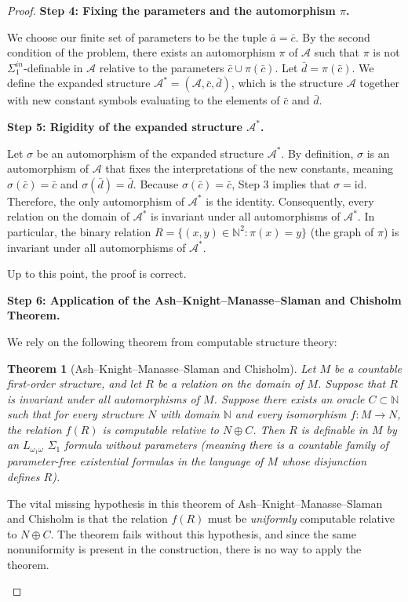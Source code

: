 \documentclass[12pt]{article}
\newtheorem*{theorem*}{Theorem}
\newcommand{\review}[1]{\begin{reviewbox}#1\end{reviewbox}}
\begin{document}
\begin{proof}
\textbf{Step 4: Fixing the parameters and the automorphism $\pi$.}

We choose our finite set of parameters to be the tuple $\bar{a} = \bar{c}$. By the second condition of the problem, there exists an automorphism $\pi$ of $\mathcal{A}$ such that $\pi$ is not $\Sigma^{in}_1$-definable in $\mathcal{A}$ relative to the parameters $\bar{c} \cup \pi(\bar{c})$. 
Let $\bar{d} = \pi(\bar{c})$. 
We define the expanded structure $\mathcal{A}^* = (\mathcal{A}, \bar{c}, \bar{d})$, which is the structure $\mathcal{A}$ together with new constant symbols evaluating to the elements of $\bar{c}$ and $\bar{d}$. 

\textbf{Step 5: Rigidity of the expanded structure $\mathcal{A}^*$.}

Let $\sigma$ be an automorphism of the expanded structure $\mathcal{A}^*$. By definition, $\sigma$ is an automorphism of $\mathcal{A}$ that fixes the interpretations of the new constants, meaning $\sigma(\bar{c}) = \bar{c}$ and $\sigma(\bar{d}) = \bar{d}$. 
Because $\sigma(\bar{c}) = \bar{c}$, Step 3 implies that $\sigma = \mathrm{id}$. 
Therefore, the only automorphism of $\mathcal{A}^*$ is the identity. Consequently, every relation on the domain of $\mathcal{A}^*$ is invariant under all automorphisms of $\mathcal{A}^*$. 
In particular, the binary relation $R = \{(x, y) \in \mathbb{N}^2 : \pi(x) = y\}$ (the graph of $\pi$) is invariant under all automorphisms of $\mathcal{A}^*$.

\review{Up to this point, the proof is correct.}

\textbf{Step 6: Application of the Ash--Knight--Manasse--Slaman and Chisholm Theorem.}

We rely on the following theorem from computable structure theory:
\begin{theorem*}[Ash--Knight--Manasse--Slaman and Chisholm]
Let $M$ be a countable first-order structure, and let $R$ be a relation on the domain of $M$. Suppose that $R$ is invariant under all automorphisms of $M$. Suppose there exists an oracle $C \subset \mathbb{N}$ such that for every structure $N$ with domain $\mathbb{N}$ and every isomorphism $f: M \to N$, the relation $f(R)$ is computable relative to $N \oplus C$. Then $R$ is definable in $M$ by an $L_{\omega_1\omega}$ $\Sigma_1$ formula without parameters (meaning there is a countable family of parameter-free existential formulas in the language of $M$ whose disjunction defines $R$).
\end{theorem*}

\review{The vital missing hypothesis in this theorem of Ash--Knight--Manasse--Slaman and Chisholm is that the relation $f(R)$ must be \textit{uniformly} computable relative to $N \oplus C$. The theorem fails without this hypothesis, and since the same nonuniformity is present in the construction, there is no way to apply the theorem.

}
\end{proof}
\end{document}
